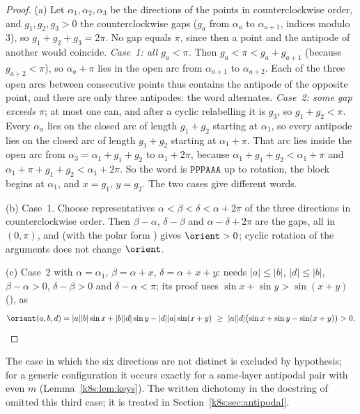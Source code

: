 \begin{proof}
(a) Let $\alpha_1,\alpha_2,\alpha_3$ be the directions of the points in counterclockwise order, and $g_1,g_2,g_3>0$ the
counterclockwise gaps ($g_a$ from $\alpha_a$ to $\alpha_{a+1}$, indices modulo $3$), so $g_1+g_2+g_3=2\pi$. No gap equals
$\pi$, since then a point and the antipode of another would coincide. \emph{Case~1: all $g_a<\pi$.} Then
$g_a<\pi<g_a+g_{a+1}$ (because $g_{a+2}<\pi$), so $\alpha_a+\pi$ lies in the open arc from $\alpha_{a+1}$ to $\alpha_{a+2}$.
Each of the three open arcs between consecutive points thus contains the antipode of the opposite point, and there are
only three antipodes: the word alternates. \emph{Case~2: some gap exceeds $\pi$}; at most one can, and after a cyclic
relabelling it is $g_3$, so $g_1+g_2<\pi$. Every $\alpha_a$ lies on the closed arc of length $g_1+g_2$ starting at
$\alpha_1$, so every antipode lies on the closed arc of length $g_1+g_2$ starting at $\alpha_1+\pi$. That arc lies inside
the open arc from $\alpha_3=\alpha_1+g_1+g_2$ to $\alpha_1+2\pi$, because $\alpha_1+g_1+g_2<\alpha_1+\pi$ and
$\alpha_1+\pi+g_1+g_2<\alpha_1+2\pi$. So the word is $\mathtt{PPPAAA}$ up to rotation, the block begins at $\alpha_1$, and
$x=g_1$, $y=g_2$. The two cases give different words.

(b) Case~1. Choose representatives $\alpha<\beta<\delta<\alpha+2\pi$ of the three directions in counterclockwise order.
Then $\beta-\alpha$, $\delta-\beta$ and $\alpha-\delta+2\pi$ are the gaps, all in $(0,\pi)$, and
 (with the polar form ) gives $\orient>0$; cyclic rotation of the
arguments does not change $\orient$.

(c) Case~2 with $\alpha=\alpha_1$, $\beta=\alpha+x$, $\delta=\alpha+x+y$:  needs $|a|\le|b|$,
$|d|\le|b|$, $\beta-\alpha>0$, $\delta-\beta>0$ and $\delta-\alpha<\pi$; its proof uses
$\sin x+\sin y>\sin(x+y)$ (), as
\[
\orient(a,b,d)=|a||b|\sin x+|b||d|\sin y-|d||a|\sin(x+y)\ \ge\ |a||d|\bigl(\sin x+\sin y-\sin(x+y)\bigr)>0.\qedhere
\]
\end{proof}

The case in which the six directions are not distinct is excluded by hypothesis; for a generic configuration it
occurs exactly for a same-layer antipodal pair with even $m$ (Lemma~\ref{k8s:lem:keys}). The written dichotomy in the
docstring of  omitted this third case; it is treated in Section~\ref{k8s:sec:antipodal}.

